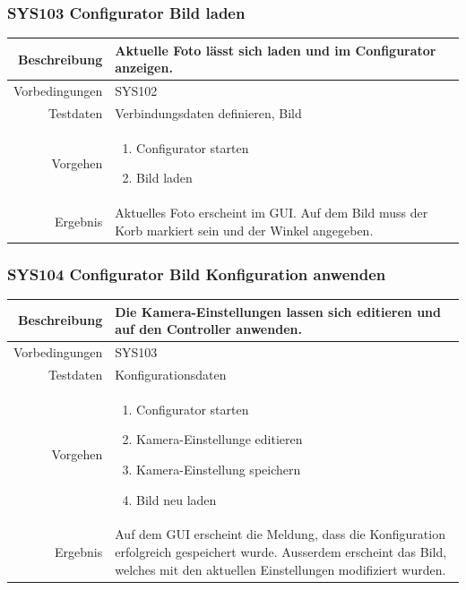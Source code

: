 \subsubsection{SYS103 Configurator Bild laden }
\begin{table}[h!]
	\renewcommand{\arraystretch}{1.5}
	\begin{tabular}{|r|p{14cm}|}
		\hline Beschreibung & Aktuelle Foto lässt sich laden und im Configurator anzeigen. \\ 
		\hline Vorbedingungen & SYS102 \\ 
		\hline Testdaten & Verbindungsdaten definieren, Bild \\ 
		\hline Vorgehen & 
		\begin{enumerate}
			\item Configurator starten
			\item Bild laden
		\end{enumerate} \\ 
		\hline Ergebnis & Aktuelles Foto erscheint im GUI. Auf dem Bild muss der Korb markiert sein und der Winkel angegeben. \\ 
		\hline 
	\end{tabular}
\end{table}
\newpage

\subsubsection{SYS104 Configurator Bild Konfiguration anwenden }
\begin{table}[h!]
	\renewcommand{\arraystretch}{1.5}
	\begin{tabular}{|r|p{14cm}|}
		\hline Beschreibung & Die Kamera-Einstellungen lassen sich editieren und auf den Controller anwenden. \\ 
		\hline Vorbedingungen & SYS103 \\ 
		\hline Testdaten & Konfigurationsdaten \\ 
		\hline Vorgehen & 
		\begin{enumerate}
			\item Configurator starten
			\item Kamera-Einstellunge editieren
			\item Kamera-Einstellung speichern
			\item Bild neu laden
		\end{enumerate} \\ 
		\hline Ergebnis & Auf dem GUI erscheint die Meldung, dass die Konfiguration erfolgreich gespeichert wurde.
		Ausserdem erscheint das Bild, welches mit den aktuellen Einstellungen modifiziert wurden. \\ 
		\hline 
	\end{tabular}
\end{table}

